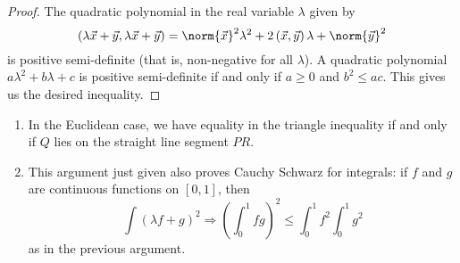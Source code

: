 \begin{proof}
	The quadratic polynomial in the real variable $\lambda$ given by %
	\begin{equation*}
		\left( \lambda\xx+\yy, \lambda\xx+\yy \right) = \norm{\xx}^2 \lambda^2 + 2\left( \xx,\yy \right)\lambda + \norm{\yy}^2 %
	\end{equation*}
	is positive semi-definite (that is, non-negative for all $\lambda$). A quadratic polynomial $a\lambda^2 + b\lambda+c$ is positive semi-definite if and only if $a\geq 0$ and $b^2\leq ac$. This gives us the desired inequality. %
\end{proof}

\begin{remarks}
\mbox{}
\begin{enumerate}
	\item In the Euclidean case, we have equality in the triangle inequality if and only if $Q$ lies on the straight line segment $PR$. %
	\item This argument just given also proves Cauchy Schwarz for integrals: if $f$ and $g$ are continuous functions on $[0,1]$, then %
	\begin{equation*}
		\int \left( \lambda f+g \right)^2 \Longrightarrow \left( \int_0^1 fg \right)^2 \leq \int_0^1 f^2 \int_0^1 g^2 %
	\end{equation*}
	as in the previous argument.
\end{enumerate}
\end{remarks}

